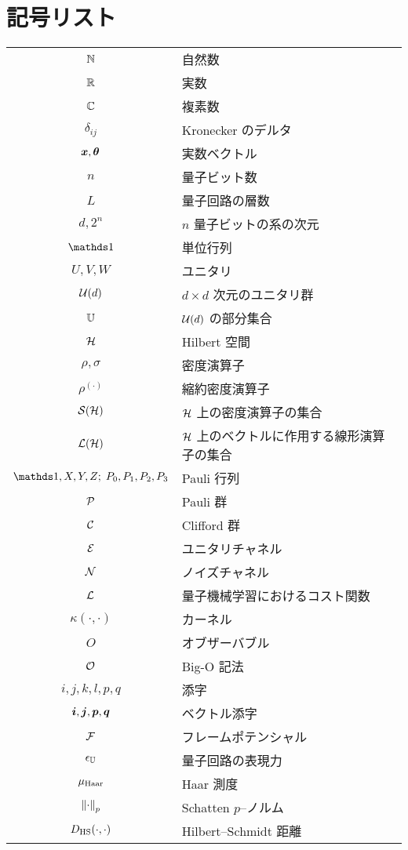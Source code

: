 \chapter*{記号リスト}
\vspace{-30pt}
\begin{tabular}{c p{}}
    $\mathbb{N}$ & 自然数 \\
    $\mathbb{R}$ & 実数 \\
    $\mathbb{C}$ & 複素数 \\
    $\delta_{ij}$ & Kronecker のデルタ \\
    $\boldsymbol{x}, \boldsymbol{\theta}$ & 実数ベクトル\\
    $n$ & 量子ビット数 \\
    $L$ & 量子回路の層数 \\
    $d, 2^n$ & $n$ 量子ビットの系の次元 \\
    $\bbid$ & 単位行列 \\
    $U,V,W$ & ユニタリ \\
    $\mathcal{U}(d)$ & $d\times d$ 次元のユニタリ群 \\
    $\mathbb{U}$ & $\mathcal{U}(d)$ の部分集合 \\
    $\mathcal{H}$ & Hilbert 空間 \\
    $\rho, \sigma$ & 密度演算子 \\
    $\rho^{(\cdot)}$ & 縮約密度演算子 \\
    $\mathcal{S}(\mathcal{H})$ & $\mathcal{H}$ 上の密度演算子の集合 \\
    $\mathcal{L}(\mathcal{H})$ & $\mathcal{H}$ 上のベクトルに作用する線形演算子の集合 \\
    $\bbid,X,Y,Z;\;P_0,P_1,P_2,P_3$ & Pauli 行列 \\
    $\mathcal{P}$ & Pauli 群 \\
    $\mathcal{C}$ & Clifford 群 \\
    $\mathcal{E}$ & ユニタリチャネル \\
    $\mathcal{N}$ & ノイズチャネル \\
    $\mathcal{L}$ & 量子機械学習におけるコスト関数 \\
    $\kappa(\cdot,\cdot)$ & カーネル \\
    $O$ & オブザーバブル \\
    $\mathcal{O}$ & Big-O 記法 \\
    $i,j,k,l,p,q$ & 添字 \\
    $\boldsymbol{i},\boldsymbol{j},\boldsymbol{p},\boldsymbol{q}$ & ベクトル添字 \\
    $\mathcal{F}$ & フレームポテンシャル \\
    $\epsilon_{\mathbb{U}}$ & 量子回路の表現力 \\
    $\mu_{\mathrm{Haar}}$ & Haar 測度 \\
    $\norm{\cdot}_p$ & Schatten $p$--ノルム \\
    $D_{\mathrm{HS}}(\cdot,\cdot)$ & Hilbert--Schmidt 距離 \\
\end{tabular}



